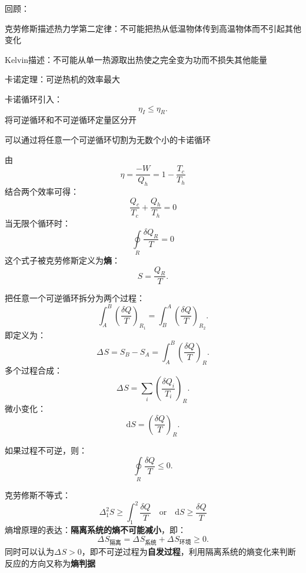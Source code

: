 回顾：
\begin{notation}
    克劳修斯描述热力学第二定律：不可能把热从低温物体传到高温物体而不引起其他变化

    Kelvin描述：不可能从单一热源取出热使之完全变为功而不损失其他能量
\end{notation}
\begin{notation}
    卡诺定理：可逆热机的效率最大
\end{notation}
卡诺循环引入：\[
    \eta_{I} \le \eta_R
.\]
将可逆循环和不可逆循环定量区分开
\begin{notation}
可以通过将任意一个可逆循环切割为无数个小的卡诺循环
\end{notation}
由\begin{equation}
    \label{eq:nwq}
    \eta = \frac{-W}{Q_{h}} = 1-\frac{T_c}{T_{h}}
\end{equation}
结合两个效率可得：
\begin{equation}
    \label{eq:qt}
    \frac{Q_c}{T_c} + \frac{Q_{h}}{T_{h}} = 0
\end{equation}
当无限个循环时：\begin{equation}
    \label{eq:ointqt}
    \oint\limits_{R} {\frac{\delta Q_R}{T}} = 0
\end{equation}
这个式子被克劳修斯定义为\textbf{熵}：
\[
    S = \frac{Q_R}{T}
.\]
\begin{eg}
    把任意一个可逆循环拆分为两个过程：\[
        \int_{A}^{B} \left(\frac{\delta Q}{T}\right)_{R_1} = \int_{B}^{A} \left(\frac{\delta Q}{T}\right)_{R_2}
    .\]
    即定义为：\[
        \Delta_\text{}S = S_{B} -S_A = \int_{A}^{B} \left(\frac{\delta Q}{T}\right)_{R}
    .\]
    多个过程合成：\[
        \Delta_\text{}S = \sum_{i}\left(\frac{\delta Q_{i}}{T_{i}}\right)_{R}
    .\]
    微小变化：\[
        \mathrm{d}S = \left(\frac{\delta Q}{T}\right)_{R}
    .\]
\end{eg}
如果过程不可逆，则：\[
    \oint\limits_{R} {\frac{\delta Q}{T}} \le 0
.\]
\begin{notation}
    克劳修斯不等式：\begin{equation}
        \label{eq:cla}
        \Delta_1^2 S \ge \int_{1}^{2} \frac{\delta Q}{T}\quad \text{or}\quad \mathrm{d}S \ge \frac{\delta Q}{T}
    \end{equation}
    熵增原理的表达：\textbf{隔离系统的熵不可能减小}，即：\[
        \Delta_\text{}S_{\text{隔离}} = \Delta_\text{}S_{\text{系统}} + \Delta_\text{}S_{\text{环境}} \ge 0
    .\]
    同时可以认为$\Delta_\text{}S > 0 $，即不可逆过程为\textbf{自发过程}，利用隔离系统的熵变化来判断反应的方向又称为\textbf{熵判据}
\end{notation}
